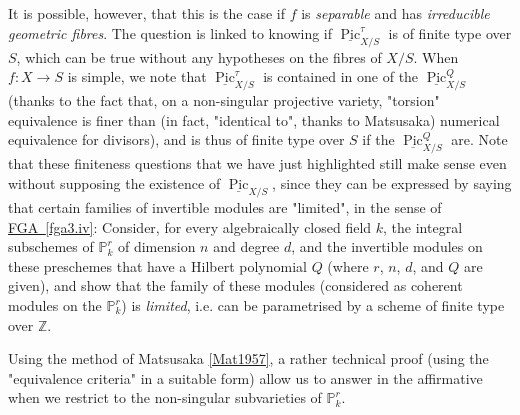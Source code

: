   It is possible, however, that this is the case if \(f\) is \emph{separable} and has \emph{irreducible geometric fibres}.
  The question is linked to knowing if \(\underline {\operatorname {Pic}}_{X/S}^\tau \) is of finite type over \(S\), which can be true without any hypotheses on the fibres of \(X/S\).
  When \(f\colon  X\to  S\) is simple, we note that \(\underline {\operatorname {Pic}}_{X/S}^\tau \) is contained in one of the \(\underline {\operatorname {Pic}}_{X/S}^Q\) (thanks to the fact that, on a non-singular projective variety, "torsion" equivalence is finer than (in fact, "identical to", thanks to Matsusaka) numerical equivalence for divisors), and is thus of finite type over \(S\) if the \(\underline {\operatorname {Pic}}_{X/S}^Q\) are.
  Note that these finiteness questions that we have just highlighted still make sense even without supposing the existence of \(\underline {\operatorname {Pic}}_{X/S}\), since they can be expressed by saying that certain families of invertible modules are "limited", in the sense of \hyperref[fga3.iv]{FGA~\ref*{fga3.iv}}:
  Consider, for every algebraically closed field \(k\), the integral subschemes of \(\mathbb {P}_k^r\) of dimension \(n\) and degree \(d\), and the invertible modules on these preschemes that have a Hilbert polynomial \(Q\) (where \(r\), \(n\), \(d\), and \(Q\) are given), and show that the family of these modules (considered as coherent modules on the \(\mathbb {P}_k^r\)) is \emph{limited}, i.e. can be parametrised by a scheme of finite type over \(\mathbb {Z}\).\par{}Using the method of Matsusaka \hyperref[Mat1957]{[Mat1957]}, a rather technical proof (using the "equivalence criteria" in a suitable form) allow us to answer in the affirmative when we restrict to the non-singular subvarieties of \(\mathbb {P}_k^r\).
